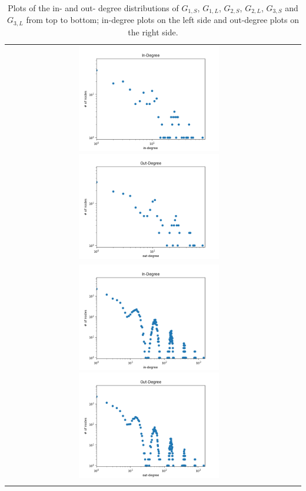\documentclass[12pt, letterpaper, twoside]{article}
\begin{document}
\begin{center}
\begin{longtable}{ c c }
    \includegraphics[width=0.5\textwidth]{3S_indeg.png} \includegraphics[width=0.5\textwidth]{3S_outdeg.png} \\
    \includegraphics[width=0.5\textwidth]{3L_indeg.png} \includegraphics[width=0.5\textwidth]{3L_outdeg.png} \\
\caption{Plots of the in- and out- degree distributions of $G_{1,S}$, $G_{1,L}$, $G_{2,S}$, $G_{2,L}$, $G_{3,S}$ and $G_{3,L}$ from top to bottom; in-degree plots on the left side and out-degree plots on the right side.}
\end{longtable}

\end{center}
\end{document}
